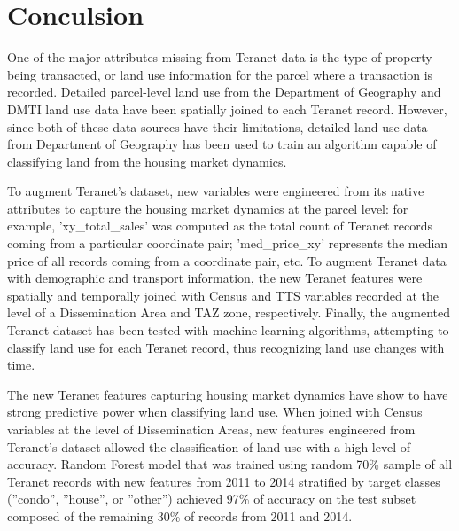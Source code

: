 \chapter{Conculsion} \label{ch:conclusion}

One of the major attributes missing from Teranet data is the type of property being transacted, or land use information for the parcel where a transaction is recorded.
Detailed parcel-level land use from the Department of Geography and DMTI land use data have been spatially joined to each Teranet record.
However, since both of these data sources have their limitations, detailed land use data from Department of Geography has been used to train an algorithm capable of classifying land from the housing market dynamics.

To augment Teranet's dataset, new variables were engineered from its native attributes to capture the housing market dynamics at the parcel level:
for example, 'xy\_total\_sales' was computed as the total count of Teranet records coming from a particular coordinate pair;
'med\_price\_xy' represents the median price of all records coming from a coordinate pair, etc.
To augment Teranet data with demographic and transport information, the new Teranet features were spatially and temporally joined with Census and TTS variables recorded at the level of a Dissemination Area and TAZ zone, respectively.
Finally, the augmented Teranet dataset has been tested with machine learning algorithms, attempting to classify land use for each Teranet record, thus recognizing land use changes with time.

The new Teranet features capturing housing market dynamics have show to have strong predictive power when classifying land use.
When joined with Census variables at the level of Dissemination Areas, new features engineered from Teranet's dataset allowed the classification of land use with a high level of accuracy.
Random Forest model that was trained using random 70\% sample of all Teranet records with new features from 2011 to 2014 stratified by target classes (''condo'', ''house'', or ''other'') achieved 97\% of accuracy on the test subset composed of the remaining 30\% of records from 2011 and 2014.